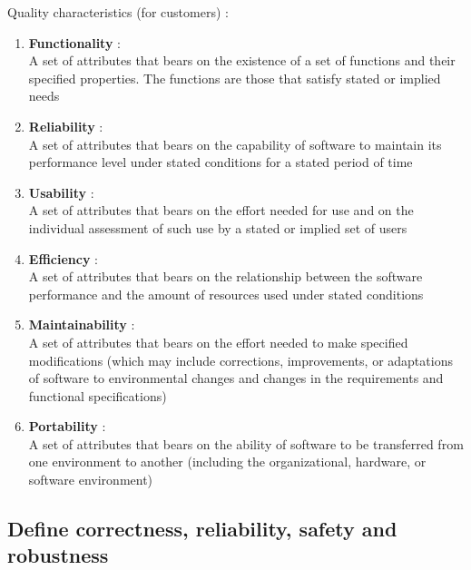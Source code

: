 \documentclass{article}
\begin{document}
\noindent Quality characteristics (for customers) : 
\begin{enumerate}
    \item \textbf{Functionality} :\\
    A set of attributes that bears on the existence of a set of functions
and their specified properties. The functions are those that satisfy
stated or implied needs
    \item \textbf{Reliability} :\\
    A set of attributes that bears on the capability of software to
maintain its performance level under stated conditions for a stated
period of time
    \item \textbf{Usability} :\\
    A set of attributes that bears on the effort needed for use and on
the individual assessment of such use by a stated or implied set of
users
    \item \textbf{Efficiency} :\\
    A set of attributes that bears on the relationship between the
software performance and the amount of resources used under
stated conditions
    \item \textbf{Maintainability} :\\
    A set of attributes that bears on the effort needed to make specified
modifications (which may include corrections, improvements, or
adaptations of software to environmental changes and changes in
the requirements and functional specifications)
    \item \textbf{Portability} :\\
    A set of attributes that bears on the ability of software to be
transferred from one environment to another (including the
organizational, hardware, or software environment)
\end{enumerate}

\newpage
\subsection{Define correctness, reliability, safety and robustness}
\end{document}
